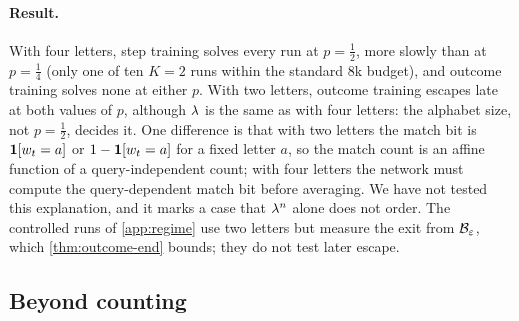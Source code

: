 \begin{table}[H]
\centering\small
{}
\caption{\textbf{Step training learns at $p=\frac12$; outcome training escapes only with two letters.} Runs reaching $90\%$ at some evaluation within $32$k AdamW updates,
with the median update at which they first do; three step runs fall back below $90\%$ by the end.}
\label{tab:p-half}
\end{table}

\paragraph{Result.} With four letters, step training solves every run at $p=\frac12$, more slowly than at $p=\frac14$ (only one of ten $K=2$ runs
within the standard $8$k budget), and outcome training solves none at either $p$. With two letters, outcome training escapes late at both values of $p$,
although $\lambda$ is the same as with four letters: the alphabet size, not $p=\frac12$, decides it. One difference is that with two letters the match bit is
$\mathbf 1[w_t=a]$ or $1-\mathbf 1[w_t=a]$ for a fixed letter $a$, so the match count is an affine function of a query-independent count; with four letters the network
must compute the query-dependent match bit before averaging. We have not tested this explanation, and it marks a case that $\lambda^n$ alone does not order.
The controlled runs of \cref{app:regime} use two letters but measure the exit from $\mathcal B_{\varepsilon}$, which \cref{thm:outcome-end} bounds; they do not test later escape.

\subsection{Beyond counting}
\label{app:exp-other}
\label{app:circuits}
\label{app:bbh}

